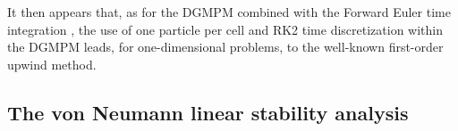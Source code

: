 It then appears that, as for the DGMPM combined with the Forward Euler time integration \cite{DGMPM}, the use of one particle per cell and RK2 time discretization within the DGMPM leads, for one-dimensional problems, to the well-known first-order upwind method.

\subsection{The von Neumann linear stability analysis}

